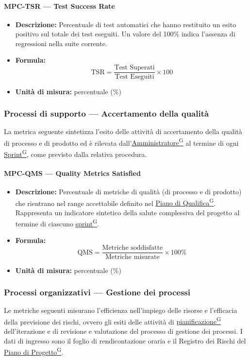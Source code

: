 \documentclass[a4paper,12pt]{article}
\providecommand{\glslink}[2]{\href{https://alittlebyte-19.github.io/Documentazione/glossario.html\#gls-#1}{\underline{#2}\textsuperscript{\scriptsize G}}}
\begin{document}
\paragraph{MPC-TSR --- Test Success Rate}
\begin{itemize}
    \item \textbf{Descrizione:} Percentuale di test automatici che hanno restituito un esito positivo sul totale dei test eseguiti. Un valore del 100\% indica l'assenza di regressioni nella suite corrente.
    \item \textbf{Formula:}
    $$\text{TSR} = \frac{\text{Test Superati}}{\text{Test Eseguiti}} \times 100$$
    \item \textbf{Unità di misura:} percentuale (\%)
\end{itemize}

\subsubsection{Processi di supporto --- Accertamento della qualità}
La metrica seguente sintetizza l'esito delle attività di accertamento della qualità di processo e di prodotto ed è rilevata dall'\glslink{amministratore}{Amministratore} al termine di ogni \glslink{sprint}{Sprint}, come previsto dalla relativa procedura.

\paragraph{MPC-QMS --- Quality Metrics Satisfied}
\begin{itemize}
    \item \textbf{Descrizione:} Percentuale di metriche di qualità (di processo e di prodotto) che rientrano nel range accettabile definito nel \glslink{piano-di-qualifica}{Piano di Qualifica}. Rappresenta un indicatore sintetico della salute complessiva del progetto al termine di ciascuno \glslink{sprint}{sprint}.
    \item \textbf{Formula:}
    $$\text{QMS} = \frac{\text{Metriche soddisfatte}}{\text{Metriche misurate}} \times 100\%$$
    \item \textbf{Unità di misura:} percentuale (\%)
\end{itemize}

\subsubsection{Processi organizzativi --- Gestione dei processi}
Le metriche seguenti misurano l'efficienza nell'impiego delle risorse e l'efficacia della previsione dei rischi, ovvero gli esiti delle attività di \glslink{pianificazione}{pianificazione} dell'iterazione e di revisione e valutazione del processo di gestione dei processi. I dati di ingresso sono il foglio di rendicontazione oraria e il Registro dei Rischi del \glslink{piano-di-progetto}{Piano di Progetto}.
\end{document}
